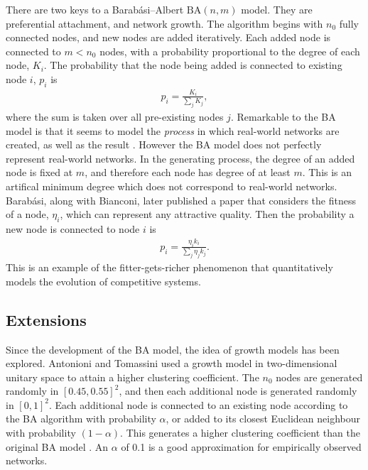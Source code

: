 There are two keys to a Barab\'{a}si--Albert $\mathrm{BA}(n,m)$ model. They are preferential attachment, and network growth. The algorithm begins with $n_0$ fully connected nodes, and new nodes are added iteratively. Each added node is connected to $m<n_0$ nodes, with a probability proportional to the degree of each node, $K_i$. The probability that the node being added is connected to existing node $i$, $p_i$ is \\
\begin{align*}
    p_i = \frac{K_i}{\sum_j K_j},
\end{align*}
where the sum is taken over all pre-existing nodes $j$. Remarkable to the BA model is that it seems to model the \emph{process} in which real-world networks are created, as well as the result \cite{RN55}. However the BA model does not perfectly represent real-world networks. In the generating process, the degree of an added node is fixed at $m$, and therefore each node has degree of at least $m$. This is an artifical minimum degree which does not correspond to real-world networks. \\

Barab\'{a}si, along with Bianconi, \cite{RN59} later published a paper that considers the fitness of a node, $\eta_i$, which can represent any attractive quality. Then the probability a new node is connected to node $i$ is \\
\begin{align*}
    p_i = \frac{\eta_ik_i}{\sum_j \eta_jk_j}.
\end{align*}
This is an example of the fitter-gets-richer phenomenon that quantitatively models the evolution of competitive systems. 

\subsection{Extensions}
Since the development of the BA model, the idea of growth models has been explored. Antonioni and Tomassini \cite{RN51} used a growth model in two-dimensional unitary space to attain a higher clustering coefficient. The $n_0$ nodes are generated randomly in $[0.45,0.55]^2$, and then each additional node is generated randomly in $[0,1]^2$. Each additional node is connected to an existing node according to the BA algorithm with probability $\alpha$, or added to its closest Euclidean neighbour with probability $(1-\alpha)$. This generates a higher clustering coefficient than the original BA model \cite{RN51}.  An $\alpha$ of 0.1 is a good approximation for empirically observed networks. \\  

